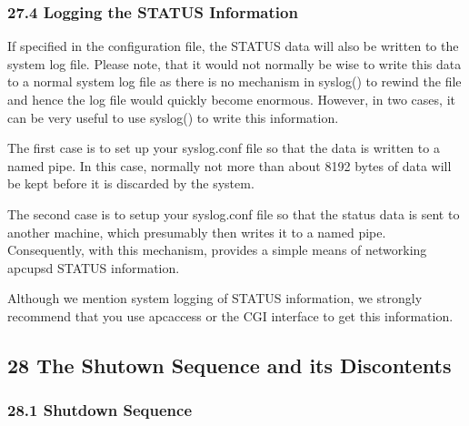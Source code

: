 {{{{{{{{{{{{{{{\label{Logging-the-STATUS-Information}

\subsubsection*{27.4 Logging the STATUS Information}

\label{index-Logging-Status-257}
\label{index-Status_002c-Logging-258}
If specified in the configuration file, the STATUS data will also be written
to the system log file. Please note, that it would not normally be wise to
write this data to a normal system log file as there is no mechanism in
syslog() to rewind the file and hence the log file would quickly become
enormous. However, in two cases, it can be very useful to use syslog() to
write this information.  

The first case is to set up your syslog.conf file so that the data is written
to a named pipe. In this case, normally not more than about 8192 bytes of data
will be kept before it is discarded by the system.  

The second case is to setup your syslog.conf file so that the status data is
sent to another machine, which presumably then writes it to a named pipe.
Consequently, with this mechanism, provides a simple means of networking
apcupsd STATUS information.  

Although we mention system logging of STATUS information, we strongly
recommend that you use apcaccess or the CGI interface to get this information.


\label{The-Shutown-Sequence-and-its-Discontents}

\subsection*{28 The Shutown Sequence and its Discontents}

\label{index-Shutdown-Sequence-259}

\label{Shutdown-Sequence-_003c1_003e}

\subsubsection*{28.1 Shutdown Sequence}

}}}}}}}}}}}}}}}
